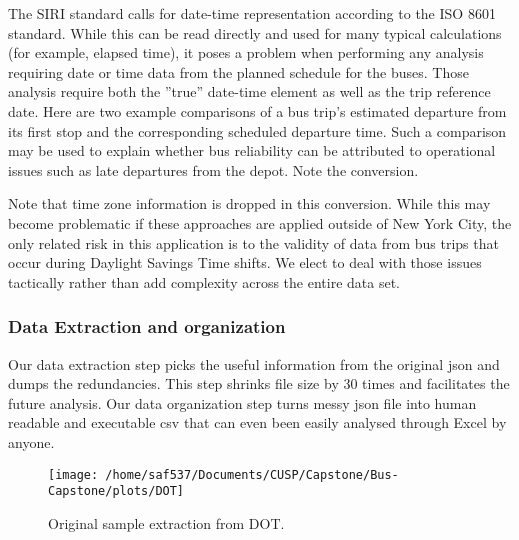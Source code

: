 \documentclass[12pt]{report}
\begin{document}
The SIRI standard calls for date-time representation according to the ISO 8601 standard.  While this can be read directly and used for many typical calculations (for example, elapsed time), it poses a problem when performing any analysis requiring date or time data from the planned schedule for the buses.  Those analysis require both the ''true'' date-time element as well as the trip reference date.  Here are two example comparisons of a bus trip's estimated departure from its first stop and the corresponding scheduled departure time. Such a comparison may be used to explain whether bus reliability can be attributed to operational issues such as late departures from the depot.  Note the conversion.

\vspace{0.5cm}


\vspace{0.5cm}

Note that time zone information is dropped in this conversion.  While this may become problematic if these approaches are applied outside of New York City, the only related risk in this application is to the validity of data from bus trips that occur during Daylight Savings Time shifts.  We elect to deal with those issues tactically rather than add complexity across the entire data set.


\subsubsection*{Data Extraction and organization} 
Our data extraction step picks the useful information from the original json and dumps the redundancies. This step shrinks file size by 30 times and facilitates the future analysis.
Our data organization step turns messy json file into human readable and executable csv that can even been easily analysed through Excel by anyone.


\begin{figure}[!ht]
  \caption{Original sample extraction from DOT.}
  \centering
    \texttt{[image: /home/saf537/Documents/CUSP/Capstone/Bus-Capstone/plots/DOT]}
\end{figure}
\end{document}
